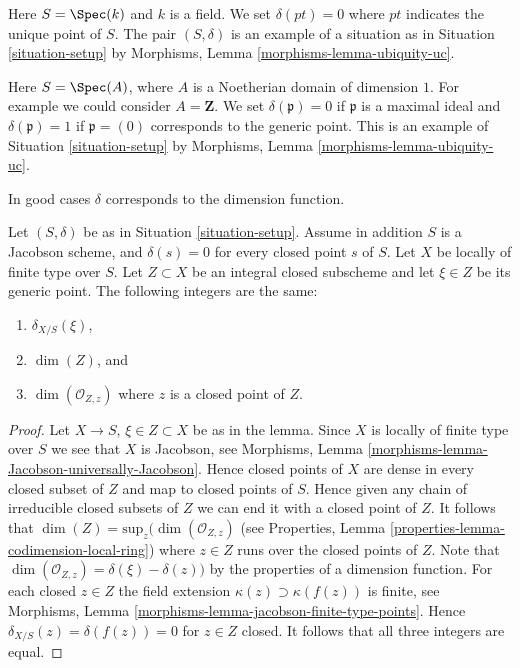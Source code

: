 \begin{example}
\label{example-field}
Here $S = \Spec(k)$ and $k$ is a field.
We set $\delta(pt) = 0$ where $pt$ indicates the unique point of $S$.
The pair $(S, \delta)$ is an example of a situation as in
Situation \ref{situation-setup} by
Morphisms, Lemma \ref{morphisms-lemma-ubiquity-uc}.
\end{example}

\begin{example}
\label{example-domain-dimension-1}
Here $S = \Spec(A)$, where $A$ is a Noetherian domain
of dimension $1$.
For example we could consider $A = \mathbf{Z}$.
We set $\delta(\mathfrak p) = 0$ if
$\mathfrak p$ is a maximal ideal and $\delta(\mathfrak p) = 1$
if $\mathfrak p = (0)$ corresponds to the generic point.
This is an example of Situation \ref{situation-setup} by
Morphisms, Lemma \ref{morphisms-lemma-ubiquity-uc}.
\end{example}

\noindent
In good cases $\delta$ corresponds to the dimension function.

\begin{lemma}
\label{lemma-delta-is-dimension}
Let $(S, \delta)$ be as in Situation \ref{situation-setup}.
Assume in addition $S$ is a Jacobson scheme, and $\delta(s) = 0$ for every
closed point $s$ of $S$. Let $X$ be locally of finite type over $S$.
Let $Z \subset X$ be an integral closed subscheme and let
$\xi \in Z$ be its generic point. The following integers are the same:
\begin{enumerate}
\item $\delta_{X/S}(\xi)$,
\item $\dim(Z)$, and
\item $\dim(\mathcal{O}_{Z, z})$ where $z$ is a closed point of $Z$.
\end{enumerate}
\end{lemma}

\begin{proof}
Let $X \to S$, $\xi \in Z \subset X$ be as in the lemma.
Since $X$ is locally of finite type over $S$ we see that
$X$ is Jacobson, see
Morphisms, Lemma \ref{morphisms-lemma-Jacobson-universally-Jacobson}.
Hence closed points of $X$ are dense in every closed subset of $Z$
and map to closed points of $S$. Hence given any chain
of irreducible closed subsets of $Z$ we can end it with a closed point of $Z$.
It follows that $\dim(Z) = \text{sup}_z(\dim(\mathcal{O}_{Z, z})$
(see Properties, Lemma \ref{properties-lemma-codimension-local-ring})
where $z \in Z$ runs over the closed points of $Z$.
Note that $\dim(\mathcal{O}_{Z, z}) = \delta(\xi) - \delta(z))$
by the properties of a dimension function.
For each closed $z \in Z$ the field extension
$\kappa(z) \supset \kappa(f(z))$ is finite, see Morphisms,
Lemma \ref{morphisms-lemma-jacobson-finite-type-points}.
Hence $\delta_{X/S}(z) = \delta(f(z)) = 0$ for $z \in Z$ closed.
It follows that all three integers are equal.
\end{proof}

